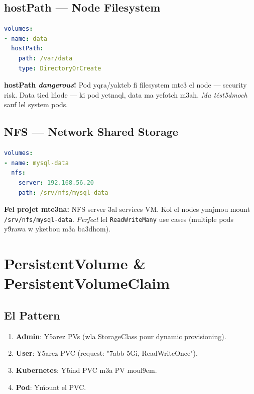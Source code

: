 \documentclass[11pt,a4paper]{book}
\newcommand{\tuni}[1]{\textit{\color{k8sdark}#1}}
\begin{document}
\subsection{hostPath --- Node Filesystem}

\begin{lstlisting}[language=yaml]
volumes:
- name: data
  hostPath:
    path: /var/data
    type: DirectoryOrCreate
\end{lstlisting}

\begin{warnbox}
\textbf{hostPath \tuni{dangerous}!} Pod yqra/yakteb fi filesystem mte3 el node --- security risk. Data tied l\'node --- ki pod yetnaql, data ma yefotch m3ah. \tuni{Ma t\'est5dmoch} sauf lel system pods.
\end{warnbox}

\subsection{NFS --- Network Shared Storage}

\begin{lstlisting}[language=yaml]
volumes:
- name: mysql-data
  nfs:
    server: 192.168.56.20
    path: /srv/nfs/mysql-data
\end{lstlisting}

\begin{tipbox}
\textbf{Fel projet mte3na:} NFS server 3al services VM. Kol el nodes ynajmou mount \texttt{/srv/nfs/mysql-data}. \tuni{Perfect} lel \texttt{ReadWriteMany} use cases (multiple pods y\'9rawa w yketbou m3a ba3dhom).
\end{tipbox}

\section{PersistentVolume \& PersistentVolumeClaim}

\subsection{El Pattern}

\begin{enumerate}
  \item \textbf{Admin}: Y5arez PVs (wla StorageClass pour dynamic provisioning).
  \item \textbf{User}: Y5arez PVC (request: "7abb 5Gi, ReadWriteOnce").
  \item \textbf{Kubernetes}: Y\'bind PVC m3a PV moul9em.
  \item \textbf{Pod}: Y\'mount el PVC.
\end{enumerate}
\end{document}
